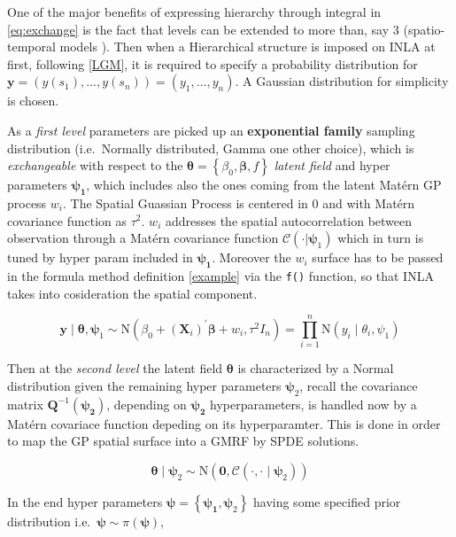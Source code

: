 \documentclass[
  12pt,
  a4paper,
  oneside]{book}
\newcommand{\passthrough}[1]{#1}
\theoremstyle{definition}
\theoremstyle{definition}
\theoremstyle{definition}
\theoremstyle{remark}
\begin{document}
One of the major benefits of expressing hierarchy through integral in \eqref{eq:exchange} is the fact that levels can be extended to more than, say 3 (spatio-temporal models \citep{PACI2017149}).
Then when a Hierarchical structure is imposed on INLA at first, following \ref{LGM}, it is required to specify a probability distribution for \(\boldsymbol{y} = \left(y\left(s_{1}\right), \ldots, y\left(s_{n}\right)\right)=\left(y_{1}, \ldots, y_{n}\right)\). A Gaussian distribution for simplicity is chosen.

As a \emph{first level} parameters are picked up an \textbf{exponential family} sampling distribution (i.e.~Normally distributed, Gamma one other choice), which is \emph{exchangeable} with respect to the \(\boldsymbol{\theta}=\left\{\beta_{0}, \boldsymbol{\beta}, f\right\}\) \emph{latent field} and hyper parameters \(\boldsymbol{\psi_{1}}\), which includes also the ones coming from the latent Matérn GP process \(w_{i}\). The Spatial Guassian Process is centered in 0 and with Matérn covariance function as \(\tau^2\). \(w_{i}\) addresses the spatial autocorrelation between observation through a Matérn covariance function \(\mathcal{C}(\cdot | \boldsymbol\psi_{1})\) which in turn is tuned by hyper param included in \(\boldsymbol{\psi_1}\). Moreover the \(w_{i}\) surface has to be passed in the formula method definition \ref{example} via the \passthrough{\lstinline!f()!} function, so that INLA takes into cosideration the spatial component.

\[
\boldsymbol{y} \mid \boldsymbol{\theta}, \boldsymbol{\psi}_{1} \sim \mathrm{N}\left(\beta_{0}+ (\mathbf{X}_{i})^{\prime}\boldsymbol{\beta} + w_{i} ,  \tau^2 I_{n}\right)=\prod_{i=1}^{n} \mathrm{N}\left(y_{i} \mid \theta_{i}, \psi_{1}\right)
\]

Then at the \emph{second level} the latent field \(\boldsymbol{\theta}\) is characterized by a Normal distribution given the remaining hyper parameters \(\boldsymbol{\psi}_2\), recall the covariance matrix \(\boldsymbol{Q}^{-1}(\boldsymbol{\psi_{2}})\), depending on \(\boldsymbol{\psi_{2}}\) hyperparameters, is handled now by a Matérn covariace function depeding on its hyperparamter. This is done in order to map the GP spatial surface into a GMRF by SPDE solutions.

\[
\boldsymbol{\theta} \mid \boldsymbol{\psi}_{2} \sim \mathrm{N}\left(\boldsymbol{0}, \mathcal{C}( \cdot , \cdot  \mid \boldsymbol{\psi}_{2})\right)
\]

In the end hyper parameters \(\boldsymbol{\psi}=\left\{\boldsymbol{\psi_{1}}, \boldsymbol{\psi}_{2}\right\}\) having some specified prior distribution i.e.~\(\boldsymbol{\psi} \sim \pi(\boldsymbol{\psi})\),
\end{document}
